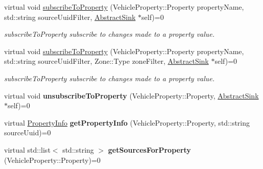 \begin{DoxyCompactItemize}
\item 
virtual void \hyperlink{classAbstractRoutingEngine_ab6df903e812321f89de573bbf6cae45a}{subscribe\-To\-Property} (Vehicle\-Property\-::\-Property property\-Name, std\-::string source\-Uuid\-Filter, \hyperlink{classAbstractSink}{Abstract\-Sink} $\ast$self)=0
\begin{DoxyCompactList}\small\item\em subscribe\-To\-Property subscribe to changes made to a property value. \end{DoxyCompactList}\item 
virtual void \hyperlink{classAbstractRoutingEngine_a65f259d8129b223f78c39cf70fa8f8e9}{subscribe\-To\-Property} (Vehicle\-Property\-::\-Property property\-Name, std\-::string source\-Uuid\-Filter, Zone\-::\-Type zone\-Filter, \hyperlink{classAbstractSink}{Abstract\-Sink} $\ast$self)=0
\begin{DoxyCompactList}\small\item\em subscribe\-To\-Property subscribe to changes made to a property value. \end{DoxyCompactList}\item 
\hypertarget{classAbstractRoutingEngine_afa92e7c8eac6c7d7f2867e9887a627d6}{virtual void {\bfseries unsubscribe\-To\-Property} (Vehicle\-Property\-::\-Property, \hyperlink{classAbstractSink}{Abstract\-Sink} $\ast$self)=0}\label{classAbstractRoutingEngine_afa92e7c8eac6c7d7f2867e9887a627d6}

\item 
\hypertarget{classAbstractRoutingEngine_a63a98e81d8ebff758f0b7df3325388ae}{virtual \hyperlink{classPropertyInfo}{Property\-Info} {\bfseries get\-Property\-Info} (Vehicle\-Property\-::\-Property, std\-::string source\-Uuid)=0}\label{classAbstractRoutingEngine_a63a98e81d8ebff758f0b7df3325388ae}

\item 
\hypertarget{classAbstractRoutingEngine_aeeba763019580f6006b8a91306f45296}{virtual std\-::list$<$ std\-::string $>$ {\bfseries get\-Sources\-For\-Property} (Vehicle\-Property\-::\-Property)=0}\label{classAbstractRoutingEngine_aeeba763019580f6006b8a91306f45296}

\end{DoxyCompactItemize}


